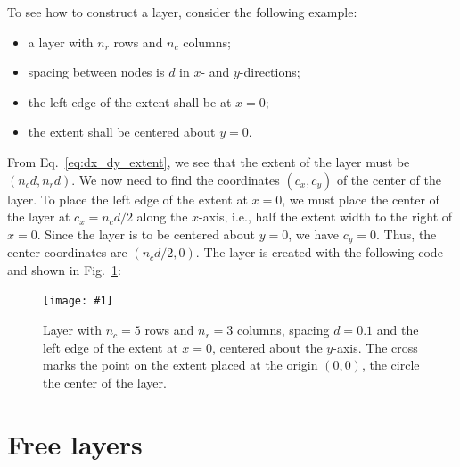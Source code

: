 \documentclass[a4paper,12pt]{report}
\newcommand{\scriptfig}[4]{%
\begin{figure}
\centerline{\texttt{[image: \#1]}}
\caption[#3]{#4}
\label{fig:#1}
\end{figure}%
}
\begin{document}
To see how to construct a layer, consider the following example: 
\begin{itemize}
\item a layer with $n_r$ rows and $n_c$ columns;
\item spacing between nodes is $d$ in $x$- and $y$-directions;
\item the left edge of the extent shall be at $x=0$;
\item the extent shall be centered about $y=0$.
\end{itemize}
From Eq.~\ref{eq:dx_dy_extent}, we see that the extent of the layer
must be $(n_c d, n_r d)$. We now need to find the coordinates $(c_x,
c_y)$ of the center of the layer. To place the left edge of the extent
at $x=0$, we must place the center of the layer at $c_x=n_c d / 2$
along the $x$-axis, i.e., half the extent width to the right of
$x=0$. Since the layer is to be centered about $y=0$, we have
$c_y=0$. Thus, the center coordinates are $(n_c d/2, 0)$. The layer is
created with the following code and shown in Fig.~\ref{fig:layer3a}:
%

\scriptfig{layer3a}{0.5}{Layer construction example}%
{Layer with $n_c=5$ rows and $n_r=3$ columns, spacing $d=0.1$ and the
  left edge of the extent at $x=0$, centered about the $y$-axis. The
  cross marks the point on the extent placed at the origin $(0,0)$,
the circle the center of the layer.}
%


\section{Free layers}\label{sec:freelayer}
\end{document}
